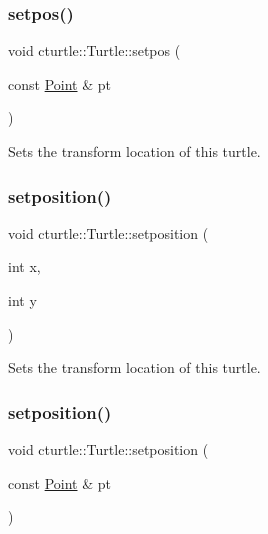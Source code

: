 \subsubsection{\texorpdfstring{setpos()}{setpos()}\hspace{0.1cm}{\footnotesize\ttfamily [2/2]}}
{\footnotesize\ttfamily void cturtle\+::\+Turtle\+::setpos (\begin{DoxyParamCaption}\item[{const \hyperlink{structcturtle_1_1ivec2}{Point} \&}]{pt }\end{DoxyParamCaption})\hspace{0.3cm}{\ttfamily [inline]}}



Sets the transform location of this turtle. 

\mbox{\label{classcturtle_1_1Turtle_a5e9dd0e59f48e49719dd4e3bd06a82f1}} 
\subsubsection{\texorpdfstring{setposition()}{setposition()}\hspace{0.1cm}{\footnotesize\ttfamily [1/2]}}
{\footnotesize\ttfamily void cturtle\+::\+Turtle\+::setposition (\begin{DoxyParamCaption}\item[{int}]{x,  }\item[{int}]{y }\end{DoxyParamCaption})\hspace{0.3cm}{\ttfamily [inline]}}



Sets the transform location of this turtle. 

\mbox{\label{classcturtle_1_1Turtle_a7a4726103a42d73006357cc12ce79b72}} 
\subsubsection{\texorpdfstring{setposition()}{setposition()}\hspace{0.1cm}{\footnotesize\ttfamily [2/2]}}
{\footnotesize\ttfamily void cturtle\+::\+Turtle\+::setposition (\begin{DoxyParamCaption}\item[{const \hyperlink{structcturtle_1_1ivec2}{Point} \&}]{pt }\end{DoxyParamCaption})\hspace{0.3cm}{\ttfamily [inline]}}



